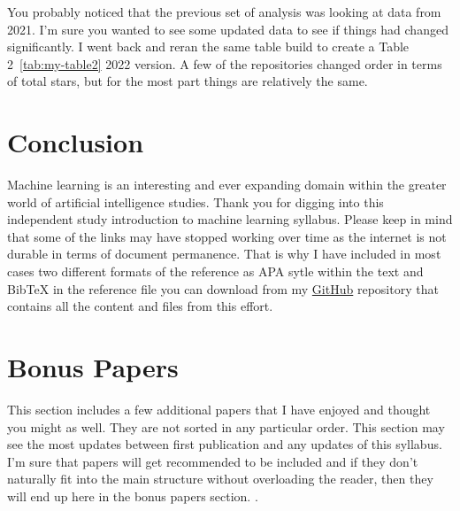 \documentclass{article}
\begin{document}
You probably noticed that the previous set of analysis was looking at data from 2021. I’m sure you wanted to see some updated data to see if things had changed significantly. I went back and reran the same table build to create a Table 2~\ref{tab:my-table2} 2022 version. A few of the repositories changed order in terms of total stars, but for the most part things are relatively the same.

\section{Conclusion}
Machine learning is an interesting and ever expanding domain within the greater world of artificial intelligence studies. Thank you for digging into this independent study introduction to machine learning syllabus. Please keep in mind that some of the links may have stopped working over time as the internet is not durable in terms of document permanence. That is why I have included in most cases two different formats of the reference as APA sytle within the text and BibTeX in the reference file you can download from my \href{https://github.com/nelslindahlx/Introduction-to-machine-learning-syllabus-2022}{GitHub} repository that contains all the content and files from this effort. 

\section{Bonus Papers}
This section includes a few additional papers that I have enjoyed and thought you might as well. They are not sorted in any particular order. This section may see the most updates between first publication and any updates of this syllabus. I’m sure that papers will get recommended to be included and if they don’t naturally fit into the main structure without overloading the reader, then they will end up here in the bonus papers section. .
\end{document}

